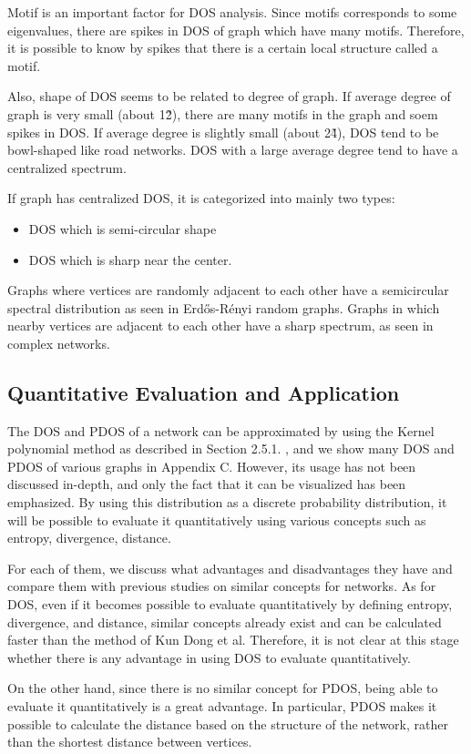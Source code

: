 \documentclass[senior,final,11pt]{iscs-thesis}
\begin{document}
Motif is an important factor for DOS analysis. Since motifs corresponds to some eigenvalues, there are spikes in DOS of graph which have many motifs. Therefore, it is possible to know by spikes that there is a certain local structure called a motif.

Also, shape of DOS seems to be related to degree of graph. If average degree of graph is very small (about 1\~2), there are many motifs in the graph and soem spikes in DOS. If average degree is slightly small (about 2\~4), DOS tend to be bowl-shaped like road networks. DOS with a large average degree tend to have a centralized spectrum.

If graph has centralized DOS, it is categorized into mainly two types:
\begin{itemize}
  \item DOS which is semi-circular shape
  \item DOS which is sharp near the center.
\end{itemize}
Graphs where vertices are randomly adjacent to each other have a semicircular spectral distribution as seen in Erdős-Rényi random graphs. Graphs in which nearby vertices are adjacent to each other have a sharp spectrum, as seen in complex networks.



\subsection{Quantitative Evaluation and Application}
The DOS and PDOS of a network can be approximated by using the Kernel polynomial method as described in Section 2.5.1. , and we show many DOS and PDOS of various graphs in Appendix C. However, its usage has not been discussed in-depth, and only the fact that it can be visualized has been emphasized.
By using this distribution as a discrete probability distribution, it will be possible to evaluate it quantitatively using various concepts such as entropy, divergence, distance.

For each of them, we discuss what advantages and disadvantages they have and compare them with previous studies on similar concepts for networks. As for DOS, even if it becomes possible to evaluate quantitatively by defining entropy, divergence, and distance, similar concepts already exist and can be calculated faster than the method of Kun Dong et al. Therefore, it is not clear at this stage whether there is any advantage in using DOS to evaluate quantitatively.

On the other hand, since there is no similar concept for PDOS, being able to evaluate it quantitatively is a great advantage. In particular, PDOS makes it possible to calculate the distance based on the structure of the network, rather than the shortest distance between vertices.
\end{document}
